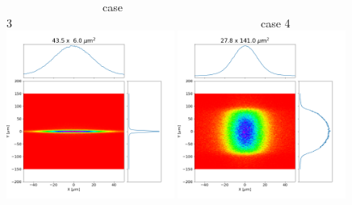 \documentclass[]{article}
\begin{document}
\begin{figure}
    ~~~~~~~~~~~~~~~~~case 3~~~~~~~~~~~~~~~~~~~~~~~~~~~~~~~~~~~~~~~~~~~~case 4\\
    \includegraphics[width=0.49\textwidth]{figures/case3_hybrid.png}
    \includegraphics[width=0.49\textwidth]{figures/case4_hybrid.png}
\end{figure}
\end{document}
